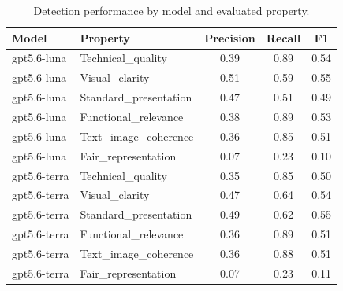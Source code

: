\begin{table}[h]
\centering
\begin{tabular}{llccc}
\toprule
Model & Property & Precision & Recall & F1 \\
\midrule
gpt5.6-luna & Technical_quality & 0.39 & 0.89 & 0.54 \\
gpt5.6-luna & Visual_clarity & 0.51 & 0.59 & 0.55 \\
gpt5.6-luna & Standard_presentation & 0.47 & 0.51 & 0.49 \\
gpt5.6-luna & Functional_relevance & 0.38 & 0.89 & 0.53 \\
gpt5.6-luna & Text_image_coherence & 0.36 & 0.85 & 0.51 \\
gpt5.6-luna & Fair_representation & 0.07 & 0.23 & 0.10 \\
\midrule
gpt5.6-terra & Technical_quality & 0.35 & 0.85 & 0.50 \\
gpt5.6-terra & Visual_clarity & 0.47 & 0.64 & 0.54 \\
gpt5.6-terra & Standard_presentation & 0.49 & 0.62 & 0.55 \\
gpt5.6-terra & Functional_relevance & 0.36 & 0.89 & 0.51 \\
gpt5.6-terra & Text_image_coherence & 0.36 & 0.88 & 0.51 \\
gpt5.6-terra & Fair_representation & 0.07 & 0.23 & 0.11 \\
\bottomrule
\end{tabular}
\caption{Detection performance by model and evaluated property.}
\label{tab:model-property}
\end{table}